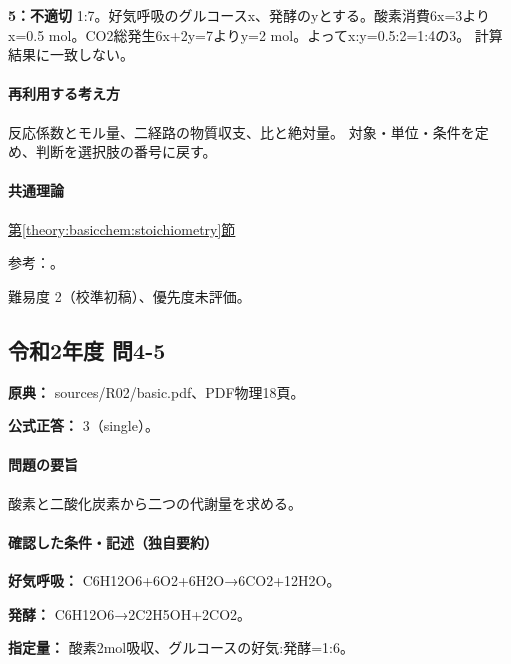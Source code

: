 \noindent\textbf{5：不適切} 1:7。好気呼吸のグルコースx、発酵のyとする。酸素消費6x=\allowbreak{}3よりx=\allowbreak{}0.5 mol。CO2総発生6x+2y=\allowbreak{}7よりy=\allowbreak{}2 mol。よってx:y=\allowbreak{}0.5:2=\allowbreak{}1:4の3。 計算結果に一致しない。\par

\paragraph{再利用する考え方} 反応係数とモル量、二経路の物質収支、比と絶対量。 対象・単位・条件を定め、判断を選択肢の番号に戻す。

\paragraph{共通理論} \hyperref[theory:basicchem:stoichiometry]{第\ref*{theory:basicchem:stoichiometry}節}

\par 参考：\cite{chem55_stoich}。

\par 難易度 2（校準初稿）、優先度未評価。

\subsection{令和2年度 問4-5}
\label{q:r02-reg-basic-4-5}

\noindent\textbf{原典：} sources/R02/basic.pdf、PDF物理18頁。

\textbf{公式正答：} 3（single）。

\paragraph{問題の要旨} 酸素と二酸化炭素から二つの代謝量を求める。

\paragraph{確認した条件・記述（独自要約）}\mbox{}\par

\noindent\textbf{好気呼吸：} C6H12O6+6O2+6H2O→6CO2+12H2O。\par

\noindent\textbf{発酵：} C6H12O6→2C2H5OH+2CO2。\par

\noindent\textbf{指定量：} 酸素2mol吸収、グルコースの好気:発酵=1:6。\par

